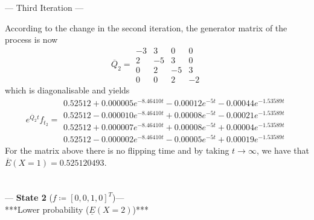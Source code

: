 \documentclass{article}
\begin{document}
--- Third Iteration ---

According to the change in the second iteration, the generator matrix of the process is now
\begin{equation*} 
 \overline{Q}_{2}= 
 \begin{array}{|rrrr|}
  -3 & 3 & 0 & 0 \\
  2 & -5 & 3 & 0 \\
  0 & 2 & -5 & 3 \\
  0 & 0 & 2 & -2 
 \end{array}
 \end{equation*}
which is diagonalisable and yields 
\begin{equation*} 
 e^{\overline{Q}_{2}t}f_{t_2}= 
 \begin{array}{|r|}
 0.52512+0.000005e^{-8.46410t}-0.00012e^{-5t}-0.00044e^{-1.53589t}\\
 0.52512-0.000010e^{-8.46410t}+0.00008e^{-5t}-0.00021e^{-1.53589t}\\
 0.52512+0.000007e^{-8.46410t}+0.00008e^{-5t}+0.00004e^{-1.53589t}\\
 0.52512-0.000002e^{-8.46410t}-0.00005e^{-5t}+0.00019e^{-1.53589t}  
 \end{array}
 \end{equation*}
For the matrix above there is no flipping time and by taking $t\to\infty$, we have that
$\overline{E}(X=1) = 0.525120493$.
\\\\\\


--- \textbf{State 2} ($f\coloneqq[0,0,1,0]^T$)---\\

***Lower probability ($\underline{E}(X=2)$)***\\
\end{document}

